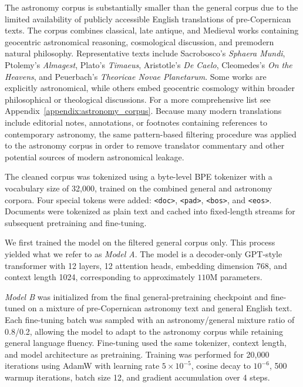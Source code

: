 The astronomy corpus is substantially smaller than the general corpus due to the limited availability of publicly accessible English translations of pre-Copernican texts. The corpus combines classical, late antique, and Medieval works containing geocentric astronomical reasoning, cosmological discussion, and premodern natural philosophy. Representative texts include Sacrobosco’s \textit{Sphaera Mundi}, Ptolemy’s \textit{Almagest}, Plato’s \textit{Timaeus}, Aristotle’s \textit{De Caelo}, Cleomedes’s \textit{On the Heavens}, and Peuerbach’s \textit{Theoricae Novae Planetarum}. Some works are explicitly astronomical, while others embed geocentric cosmology within broader philosophical or theological discussions. For a more comprehensive list see Appendix~\ref{appendix:astronomy_corpus}. Because many modern translations include editorial notes, annotations, or footnotes containing references to contemporary astronomy, the same pattern-based filtering procedure was applied to the astronomy corpus in order to remove translator commentary and other potential sources of modern astronomical leakage.

The cleaned corpus was tokenized using a byte-level BPE tokenizer with a vocabulary size of 32,000, trained on the combined general and astronomy corpora. Four special tokens were added: \texttt{<doc>}, \texttt{<pad>}, \texttt{<bos>}, and \texttt{<eos>}. Documents were tokenized as plain text and cached into fixed-length streams for subsequent pretraining and fine-tuning.

We first trained the model on the filtered general corpus only. This process yielded what we refer to as \textit{Model A}. The model is a decoder-only GPT-style transformer with 12 layers, 12 attention heads, embedding dimension 768, and context length 1024, corresponding to approximately $110$M parameters.

\textit{Model B} was initialized from the final general-pretraining checkpoint and fine-tuned on a mixture of pre-Copernican astronomy text and general English text. Each fine-tuning batch was sampled with an astronomy/general mixture ratio of 0.8/0.2, allowing the model to adapt to the astronomy corpus while retaining general language fluency. Fine-tuning used the same tokenizer, context length, and model architecture as pretraining. Training was performed for 20,000 iterations using AdamW with learning rate $5\times10^{-5}$, cosine decay to $10^{-6}$, 500 warmup iterations, batch size 12, and gradient accumulation over 4 steps.
 



